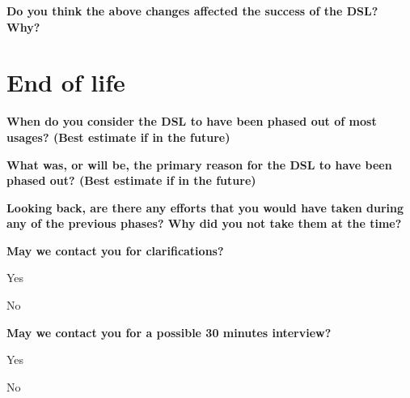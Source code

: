 \documentclass{article}
\begin{document}
\textbf{Do you think the above changes affected the success of the DSL? Why?}\\
\fbox{\begin{minipage}{\textwidth}
\
\
\
\end{minipage}}

\section*{End of life}

\textbf{When do you consider the DSL to have been phased out of most usages? (Best estimate if in the future)}\\
\fbox{\begin{minipage}{\textwidth}
\
\
\
\end{minipage}}
\vspace{0.5cm}

\textbf{What was, or will be, the primary reason for the DSL to have been phased out? (Best estimate if in the future)}\\
\fbox{\begin{minipage}{\textwidth}
\
\
\
\end{minipage}}
\vspace{0.5cm}

\textbf{Looking back, are there any efforts that you would have taken during any of the previous phases? Why did you not take them at the time?}\\
\fbox{\begin{minipage}{\textwidth}
\
\
\
\end{minipage}}
\vspace{0.5cm}

\textbf{May we contact you for clarifications?}\\
\begin{checklist}
  \item Yes
  \item No
\end{checklist}
\vspace{0.5cm}

\textbf{May we contact you for a possible 30 minutes interview?}\\
\begin{checklist}
  \item Yes
  \item No
\end{checklist}
\vspace{0.5cm}
\end{document}
